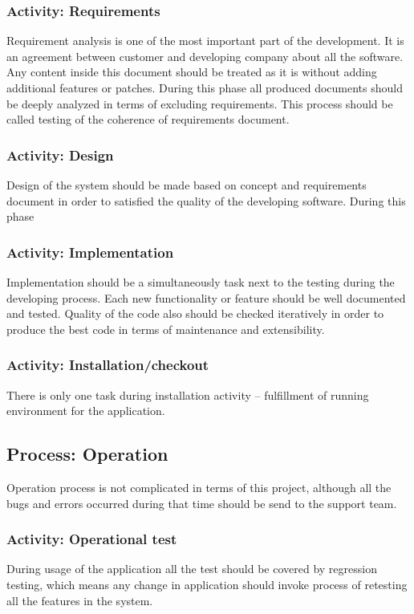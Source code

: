 		\subsubsection{Activity: Requirements} \label{s:details-of-the-master-test-plan:activity-requirements}
		Requirement analysis is one of the most important part of the development. It is an agreement between customer and developing company about all the software. Any content inside this document should be treated as it is without adding additional features or patches. During this phase all produced documents should be deeply analyzed in terms of excluding requirements. This process should be called testing of the coherence of requirements document.
		\subsubsection{Activity: Design} \label{s:details-of-the-master-test-plan:activity-design}
		Design of the system should be made based on concept and requirements document in order to satisfied the quality of the developing software. During this phase 
		\subsubsection{Activity: Implementation} \label{s:details-of-the-master-test-plan:activity-implementation}
		Implementation should be a simultaneously task next to the testing during the developing process. Each new functionality or feature should be well documented and tested. Quality of the code also should be checked iteratively in order to produce the best code in terms of maintenance and extensibility. 
		\subsubsection{Activity: Installation/checkout} \label{s:details-of-the-master-test-plan:activity-installation-checkout}
		There is only one task during installation activity -- fulfillment of running environment for the application.
	\subsection{Process: Operation} \label{s:details-of-the-master-test-plan:process-operation}
		Operation process is not complicated in terms of this project, although all the bugs and errors occurred during that time should be send to the support team. 
		\subsubsection{Activity: Operational test} \label{s:details-of-the-master-test-plan:activity-operational-test}
		During usage of the application all the test should be covered by regression testing, which means any change in application should invoke process of retesting all the features in the system.
